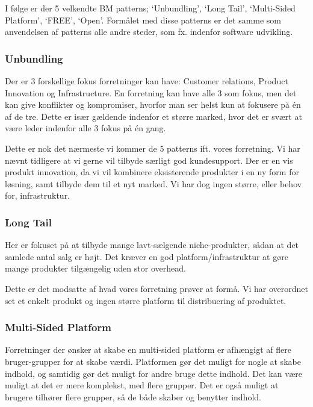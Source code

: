 
I følge \citet[pp. 52-119]{osterwalder2009business} er der 5 velkendte BM patterns; `Unbundling', `Long Tail', `Multi-Sided Platform', `FREE', `Open'.
Formålet med disse patterns er det samme som anvendelsen af patterns alle andre steder, som fx. indenfor software udvikling.

\subsubsection{Unbundling}
Der er 3 forskellige fokus forretninger kan have: Customer relations, Product Innovation og Infrastructure.
En forretning kan have alle 3 som fokus, men det kan give konflikter og kompromiser, hvorfor man ser helst kun at fokusere på én af de tre.
Dette er især gældende indenfor et større marked, hvor det er svært at være leder indenfor alle 3 fokus på én gang.

Dette er nok det nærmeste vi kommer de 5 patterns ift. vores forretning.
Vi har nævnt tidligere at vi gerne vil tilbyde særligt god kundesupport.
Der er en vis produkt innovation, da vi vil kombinere eksisterende produkter i en ny form for løsning, samt tilbyde dem til et nyt marked.
Vi har dog ingen større, eller behov for, infrastruktur.

\subsubsection{Long Tail}
Her er fokuset på at tilbyde mange lavt-sælgende niche-produkter, sådan at det samlede antal salg er højt.
Det kræver en god platform/infrastruktur at gøre mange produkter tilgængelig uden stor overhead.

Dette er det modsatte af hvad vores forretning prøver at formå.
Vi har overordnet set et enkelt produkt og ingen større platform til distribuering af produktet.

\subsubsection{Multi-Sided Platform}
Forretninger der ønsker at skabe en multi-sided platform er afhængigt af flere bruger-grupper for at skabe værdi.
Platformen gør det muligt for nogle at skabe indhold, og samtidig gør det muligt for andre bruge dette indhold.
Det kan være muligt at det er mere komplekst, med flere grupper.
Det er også muligt at brugere tilhører flere grupper, så de både skaber og benytter indhold.


